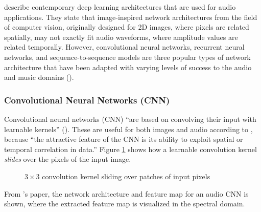 \documentclass[report.tex]{subfiles}
\begin{document}
\textcite{audiodeeplearning} describe contemporary deep learning architectures that are used for audio applications. They state that image-inspired network architectures from the field of computer vision, originally designed for 2D images, where pixels are related spatially, may not exactly fit audio waveforms, where amplitude values are related temporally. However, convolutional neural networks, recurrent neural networks, and sequence-to-sequence models are three popular types of network architecture that have been adapted with varying levels of success to the audio and music domains (\cite{audiodeeplearning}).

\newpagefill

\subsubsection{Convolutional Neural Networks (CNN)}

Convolutional neural networks (CNN) ``are based on convolving their input with learnable kernels'' (\cite{audiodeeplearning}). These are useful for both images and audio according to \textcite{cnns}, because ``the attractive feature of the CNN is its ability to exploit spatial or temporal correlation in data.'' Figure \ref{fig:cnnbasic} shows how a learnable convolution kernel \textit{slides} over the pixels of the input image.

\begin{figure}[ht]
	\centering
	\hspace{0.15em}
	\caption{$3 \times 3$ convolution kernel sliding over patches of input pixels}
	\label{fig:cnnbasic}
\end{figure}

From \textcite{audiocnn2}'s paper, the network architecture and feature map for an audio CNN is shown, where the extracted feature map is visualized in the spectral domain.
\end{document}
